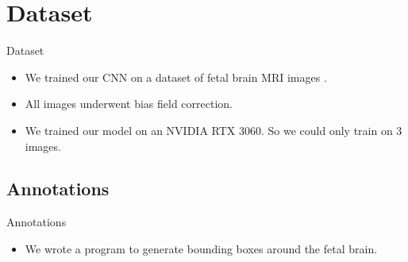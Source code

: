 \section[Dataset]{Dataset}

\begin{frame}{Dataset}
    \begin{itemize}
        \item<1-> We trained our CNN on a dataset of fetal brain MRI images
            \cite{dataset}.
        \item<2-> All images underwent bias field correction.
        \item<3-> We trained our model on an NVIDIA RTX 3060. So we could only
            train on 3 images.
    \end{itemize}
\end{frame}

\subsection{Annotations}
\begin{frame}{Annotations}
    \begin{itemize}
        \item<1-> We wrote a program to generate bounding boxes around the fetal
            brain.
    \end{itemize}
\end{frame}
